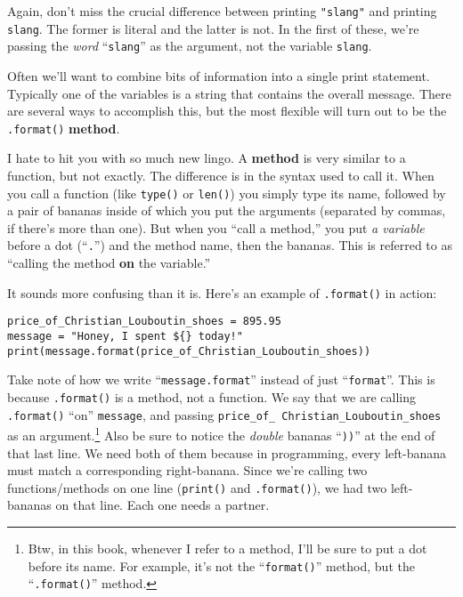 Again, don't miss the crucial difference between printing \texttt{"slang"} and
printing \texttt{slang}. The former is literal and the latter is not. In the
first of these, we're passing the \textit{word} ``\texttt{slang}'' as the
argument, not the variable \texttt{slang}.

Often we'll want to combine bits of information into a single print statement.
Typically one of the variables is a string that contains the overall message.
There are several ways to accomplish this, but the most flexible will turn out
to be the \texttt{.format()} \textbf{method}.

I hate to hit you with so much new lingo. A \textbf{method} is very similar to
a function, but not exactly. The difference is in the syntax used to call it.
When you call a function (like \texttt{type()} or \texttt{len()}) you simply
type its name, followed by a pair of bananas inside of which you put the
arguments (separated by commas, if there's more than one). But when you ``call
a method,'' you put \textit{a variable} before a dot (``\texttt{.}'') and the
method name, then the bananas. This is referred to as ``calling the method
\textbf{on} the variable.''

It sounds more confusing than it is. Here's an example of \texttt{.format()} in
action:

\begin{Verbatim}[fontsize=\small,samepage=true,frame=single,framesep=3mm]
price_of_Christian_Louboutin_shoes = 895.95
message = "Honey, I spent ${} today!"
print(message.format(price_of_Christian_Louboutin_shoes))
\end{Verbatim}

Take note of how we write ``\texttt{message.format}'' instead of just
``\texttt{format}''. This is because \texttt{.format()} is a method, not a
function. We say that we are calling \texttt{.format()} ``on''
\texttt{message}, and passing \texttt{price\_of\_}\ \texttt{Christian\_Louboutin\_shoes}
as an argument.\footnote{Btw, in this book, whenever I refer to a method, I'll
be sure to put a dot before its name. For example, it's not the
``\texttt{format()}'' method, but the ``\texttt{.format()}'' method.} Also be
sure to notice the \textit{double} bananas ``\texttt{))}'' at the end of that
last line. We need both of them because in programming, every left-banana must
match a corresponding right-banana. Since we're calling two functions/methods
on one line (\texttt{print()} and \texttt{.format()}), we had two left-bananas
on that line. Each one needs a partner.

